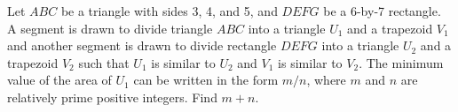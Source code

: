 Let $ABC$ be a triangle with sides 3, 4, and 5, and $DEFG$ be a 6-by-7 rectangle. A segment is drawn to divide triangle $ABC$ into a triangle $U_1$ and a trapezoid $V_1$ and another segment is drawn to divide rectangle $DEFG$ into a triangle $U_2$ and a trapezoid $V_2$ such that $U_1$ is similar to $U_2$ and $V_1$ is similar to $V_2$. The minimum value of the area of $U_1$ can be written in the form $m/n$, where $m$ and $n$ are relatively prime positive integers. Find $m+n$.